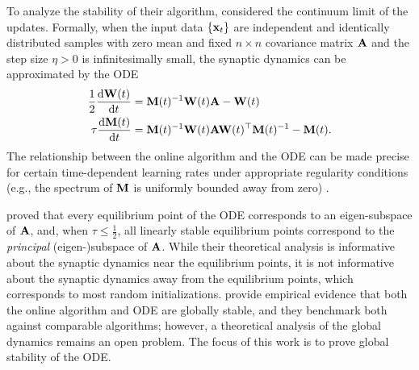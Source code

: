 \documentclass[11pt]{article}
\theoremstyle{definition}
\newcommand{\dd}{\operatorname{d}\!}
\newcommand{\x}{{\bf x}}
\newcommand{\A}{{\bf A}}
\newcommand{\M}{{\bf M}}
\newcommand{\W}{{\bf W}}
\begin{document}
To analyze the stability of their algorithm, \citet{pehlevan2018similarity} considered the continuum limit of the updates. Formally, when the input data $\{\x_t\}$ are independent and identically distributed samples with zero mean and fixed $n\times n$ covariance matrix $\A$ and the step size $\eta>0$ is infinitesimally small, the synaptic dynamics can be approximated by the ODE
\begin{align}
    \label{eq:dW}
    \frac12\frac{\dd \W(t)}{\dd t}&=\M(t)^{-1}\W(t) \A -\W(t)\\
    \label{eq:dM}
    \tau\frac{\dd \M(t)}{\dd t}&=\M(t)^{-1}\W(t) \A \W(t)^\top \M(t)^{-1}-\M(t).
\end{align}
The relationship between the online algorithm and the ODE can be made precise for certain time-dependent learning rates under appropriate regularity conditions (e.g., the spectrum of $\M$ is uniformly bounded away from zero) \citep{borkar1997stochastic,kushner2012stochastic}. 

\citet{pehlevan2018similarity} proved that every equilibrium point of the ODE corresponds to an eigen-subspace of $\A$, and, when $\tau\le\frac12$, all linearly stable equilibrium points correspond to the \textit{principal} (eigen-)subspace of $\A$. While their theoretical analysis is informative about the synaptic dynamics near the equilibrium points, it is not informative about the synaptic dynamics away from the equilibrium points, which corresponds to most random initializations. \citet{pehlevan2015hebbian,pehlevan2018similarity} provide empirical evidence that both the online algorithm and ODE are globally stable, and they benchmark both against comparable algorithms; however, a theoretical analysis of the global dynamics remains an open problem. The focus of this work is to prove global stability of the ODE.
\end{document}
